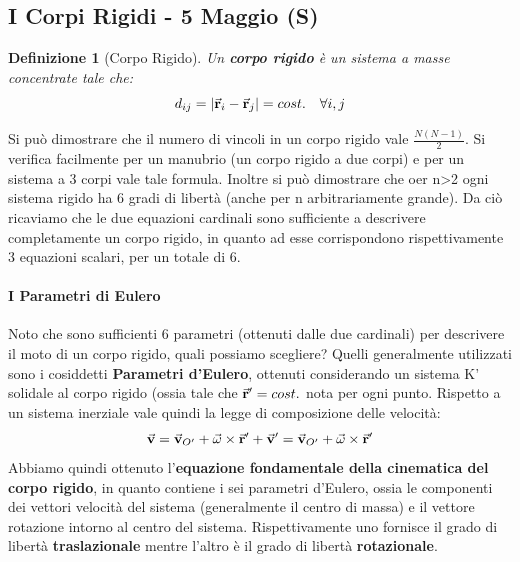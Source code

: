 \documentclass{article}
\newtheorem{defn}{Definizione}[section]
\newcommand{\note}{\noindent {\quad \bf \underline{Osservazione:}} \quad}
\renewcommand{\v}{\va{v}}
\renewcommand{\r}{\va{r}}
\begin{document}
\subsection{I Corpi Rigidi - 5 Maggio (S)}
\begin{defn}[Corpo Rigido]
Un \textbf{corpo rigido} è un sistema a masse concentrate tale che:
\begin{equation}
    d_{ij}=|\r_i-\r_j|=cost.\quad\forall i,j
\end{equation}
\end{defn}
\note Si può dimostrare che il numero di vincoli in un corpo rigido vale $\frac{N(N-1)}{2}$. Si verifica facilmente per un manubrio (un corpo rigido a due corpi) e per un sistema a 3 corpi vale tale formula. Inoltre si può dimostrare che oer n>2 ogni sistema rigido ha 6 gradi di libertà (anche per n arbitrariamente grande). Da ciò ricaviamo che le due equazioni cardinali sono sufficiente a descrivere completamente un corpo rigido, in quanto ad esse corrispondono rispettivamente 3 equazioni scalari, per un totale di 6.

\paragraph{I Parametri di Eulero}
Noto che sono sufficienti 6 parametri (ottenuti dalle due cardinali) per descrivere il moto di un corpo rigido, quali possiamo scegliere? Quelli generalmente utilizzati sono i cosiddetti \textbf{Parametri d'Eulero}, ottenuti considerando un sistema K' solidale al corpo rigido (ossia tale che $\r'=cost.$ nota per ogni punto. Rispetto a un sistema inerziale vale quindi la legge di composizione delle velocità:
\[\v=\v_{O'}+\va{\omega}\times\r'+\v'=\v_{O'}+\va{\omega}\times\r'  \]
Abbiamo quindi ottenuto l'\textbf{equazione fondamentale della cinematica del corpo rigido}, in quanto contiene i sei parametri d'Eulero, ossia le componenti dei vettori velocità del sistema (generalmente il centro di massa) e il vettore rotazione intorno al centro del sistema. Rispettivamente uno fornisce il grado di libertà \textbf{traslazionale} mentre l'altro è il grado di libertà \textbf{rotazionale}.
\end{document}
